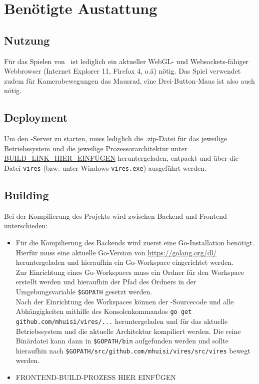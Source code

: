 \section{Benötigte Austattung}
\subsection{Nutzung}
Für das Spielen von \vires\ ist lediglich ein aktueller WebGL- und Websockets-fähiger Webbrowser (Internet Explorer 11, Firefox 4, o.ä) nötig.
Das Spiel verwendet zudem für Kamerabewegungen das Mausrad, eine Drei-Button-Maus ist also auch nötig.

\subsection{Deployment}
Um den \vires-Server zu starten, muss lediglich die .zip-Datei für das jeweilige Betriebssystem und die jeweilige Prozessorarchitektur unter 
\url{BUILD_LINK_HIER_EINFÜGEN} heruntergeladen, entpackt und über die Datei \verb+vires+ (bzw. unter Windows \verb+vires.exe+) ausgeführt werden.

\subsection{Building}
Bei der Kompilierung des Projekts wird zwischen Backend und Frontend unterschieden:
\begin{itemize}
	\item Für die Kompilierung des Backends wird zuerst eine Go-Installation benötigt.\\
	Hierfür muss eine aktuelle Go-Version von \url{https://golang.org/dl/} heruntergeladen und hieraufhin ein Go-Workspace eingerichtet werden.\\
	Zur Einrichtung eines Go-Workspaces muss ein Ordner für den Workspace erstellt werden und hieraufhin der Pfad des Ordners in der Umgebungsvariable 
	\verb+$GOPATH+ gesetzt werden.\\
	Nach der Einrichtung des Workspaces können der \vires-Sourcecode und alle Abhängigkeiten mithilfe des Konsolenkommandos
	\verb+go get github.com/mhuisi/vires/...+ heruntergeladen und für das aktuelle Betriebssystem und die aktuelle Architektur kompiliert werden. 
	Die reine Binärdatei kann dann in \verb+$GOPATH/bin+ aufgefunden werden und sollte hieraufhin nach
	\verb+$GOPATH/src/github.com/mhuisi/vires/src/vires+ bewegt werden.
	\item FRONTEND-BUILD-PROZESS HIER EINFÜGEN
\end{itemize}